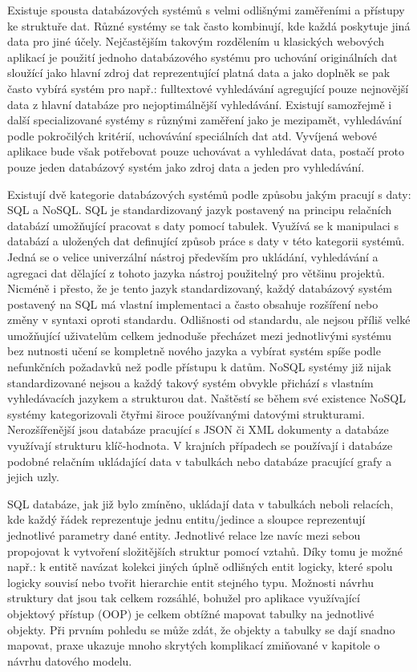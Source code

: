 	Existuje spousta databázových systémů s velmi odlišnými zaměřeními a přístupy ke struktuře dat.
	Různé systémy se tak často kombinují, kde každá poskytuje jiná data pro jiné účely.
	Nejčastějším takovým rozdělením u klasických webových aplikací je použití jednoho databázového systému pro
	uchování originálních dat sloužící jako hlavní zdroj dat reprezentující platná data a jako doplněk se pak často vybírá
	systém pro např.: fulltextové vyhledávání agregující pouze nejnovější data z hlavní databáze pro nejoptimálnější vyhledávání.
	Existují samozřejmě i další specializované systémy s různými zaměření jako je mezipamět, vyhledávání podle pokročilých kritérií,
	uchovávání speciálních dat atd.
	Vyvíjená webové aplikace bude však potřebovat pouze uchovávat a vyhledávat data, postačí proto pouze jeden databázový systém
	jako zdroj data a jeden pro vyhledávání.

	Existují dvě kategorie databázových systémů podle způsobu jakým pracují s daty: \noindent\Ac{SQL} a \noindent\Ac{NoSQL}.
	\Ac{SQL} je standardizovaný jazyk postavený na principu relačních databází umožňující pracovat s daty pomocí tabulek.
	Využívá se k manipulaci s databází a uložených dat definující způsob práce s daty v této kategorii systémů.
	Jedná se o velice univerzální nástroj především pro ukládání, vyhledávání a agregaci dat dělající z tohoto jazyka
	nástroj použitelný pro většinu projektů.
	Nicméně i přesto, že je tento jazyk standardizovaný, každý databázový systém postavený na \Ac{SQL}
	má vlastní implementaci a často obsahuje rozšíření nebo změny v syntaxi oproti standardu. \cite{sql_intro}
	Odlišnosti od standardu, ale nejsou příliš velké umožňující uživatelům celkem jednoduše přecházet mezi jednotlivými
	systému bez nutnosti učení se kompletně nového jazyka a vybírat systém spíše podle nefunkčních požadavků než
	podle přístupu k datům.
	\Ac{NoSQL} systémy již nijak standardizované nejsou a každý takový systém obvykle přichází s vlastním
	vyhledávacích jazykem a strukturou dat.
	Naštěstí se během své existence \Ac{NoSQL} systémy kategorizovali čtyřmi široce používanými
	datovými strukturami.
	Nerozšířenější jsou databáze pracující s \noindent\Ac{JSON} či \Ac{XML} dokumenty a databáze využívají strukturu klíč-hodnota.
	V krajních případech se používají i databáze podobné relačním ukládající data v tabulkách nebo databáze pracující
	grafy a jejich uzly. \cite{nosql_explained}

	\Ac{SQL} databáze, jak již bylo zmíněno, ukládají data v tabulkách neboli relacích, kde každý řádek reprezentuje
	jednu entitu/jedince a sloupce reprezentují jednotlivé parametry dané entity.
	Jednotlivé relace lze navíc mezi sebou propojovat k vytvoření složitějších struktur pomocí vztahů.
	Díky tomu je možné např.: k entitě navázat kolekci jiných úplně odlišných entit logicky, které spolu logicky souvisí
	nebo tvořit hierarchie entit stejného typu.
	Možnosti návrhu struktury dat jsou tak celkem rozsáhlé, bohužel pro aplikace využívající objektový přístup (\noindent\Ac{OOP})
	je celkem obtížné mapovat tabulky na jednotlivé objekty.
	Při prvním pohledu se může zdát, že objekty a tabulky se dají snadno mapovat, praxe ukazuje mnoho skrytých komplikací
	zmiňované v kapitole o návrhu datového modelu. %

